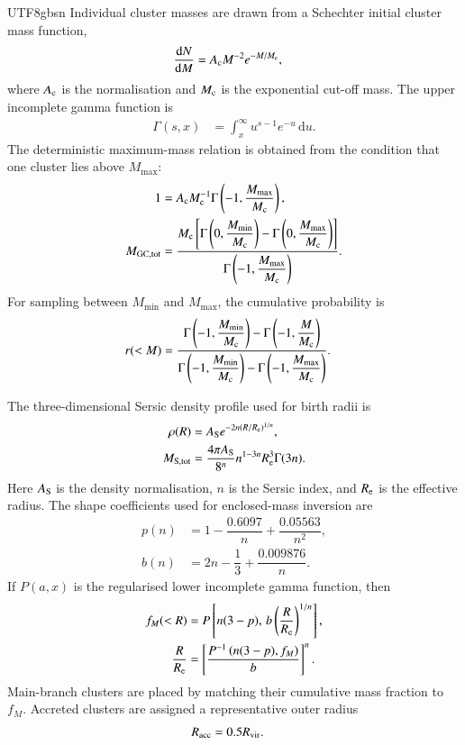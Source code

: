 \documentclass[trackchanges, twocolappendix, twocolumn]{aastex701}
\begin{document}
\begin{CJK*}{UTF8}{gbsn}
Individual cluster masses are drawn from a Schechter initial cluster mass function,
\begin{align}
\dfrac{\mathrm{d}N}{\mathrm{d}M} &= A_{\rm c}M^{-2}e^{-M/M_{\rm c}},
\end{align}
where $A_{\rm c}$ is the normalisation and $M_{\rm c}$ is the exponential cut-off mass. The upper incomplete gamma function is
\begin{align}
\Gamma(s,x) &= \int_x^{\infty} u^{s-1}e^{-u}\,\mathrm{d}u.
\end{align}
The deterministic maximum-mass relation is obtained from the condition that one cluster lies above $M_{\max}$:
\begin{align}
1 &= A_{\rm c}M_{\rm c}^{-1}\Gamma\left(-1,\dfrac{M_{\max}}{M_{\rm c}}\right),\\
M_{\rm GC,tot} &=
\dfrac{M_{\rm c}
\left[
\Gamma\left(0,\dfrac{M_{\min}}{M_{\rm c}}\right)
-\Gamma\left(0,\dfrac{M_{\max}}{M_{\rm c}}\right)
\right]}
{\Gamma\left(-1,\dfrac{M_{\max}}{M_{\rm c}}\right)}.
\end{align}
For sampling between $M_{\min}$ and $M_{\max}$, the cumulative probability is
\begin{align}
r(<M) &=
\dfrac{
\Gamma\left(-1,\dfrac{M_{\min}}{M_{\rm c}}\right)
-\Gamma\left(-1,\dfrac{M}{M_{\rm c}}\right)}
{
\Gamma\left(-1,\dfrac{M_{\min}}{M_{\rm c}}\right)
-\Gamma\left(-1,\dfrac{M_{\max}}{M_{\rm c}}\right)}.
\end{align}

The three-dimensional Sersic density profile used for birth radii is
\begin{align}
\rho(R) &= A_{\rm S}e^{-2n(R/R_{\rm e})^{1/n}},\\
M_{\rm S,tot} &=
\dfrac{4\pi A_{\rm S}}{8^n}
n^{1-3n}R_{\rm e}^3\Gamma(3n).
\end{align}
Here $A_{\rm S}$ is the density normalisation, $n$ is the Sersic index, and $R_{\rm e}$ is the effective radius. The shape coefficients used for enclosed-mass inversion are
\begin{align}
p(n) &= 1-\dfrac{0.6097}{n}+\dfrac{0.05563}{n^2},\\
b(n) &= 2n-\dfrac{1}{3}+\dfrac{0.009876}{n}.
\end{align}
If $P(a,x)$ is the regularised lower incomplete gamma function, then
\begin{align}
f_M(<R) &= P\left[n(3-p),\,b\left(\dfrac{R}{R_{\rm e}}\right)^{1/n}\right],\\
\dfrac{R}{R_{\rm e}} &=
\left[
\dfrac{P^{-1}\left(n(3-p),f_M\right)}{b}
\right]^n.
\end{align}
Main-branch clusters are placed by matching their cumulative mass fraction to $f_M$. Accreted clusters are assigned a representative outer radius
\begin{align}
R_{\rm acc} &= 0.5R_{\rm vir}.
\end{align}


\end{CJK*}
\end{document}
